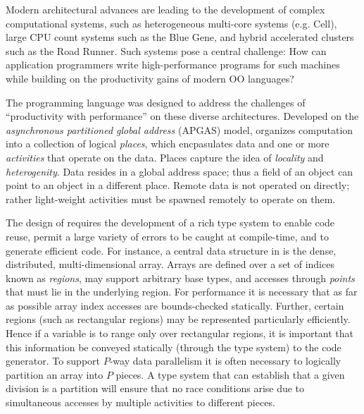 
Modern architectural advances are leading to the development of
complex computational systems, such as heterogeneous multi-core
systems (e.g. Cell), large CPU count systems such as the Blue Gene,
and hybrid accelerated clusters such as the Road Runner.  Such systems
pose a central challenge: How can application programmers write
high-performance programs for such machines while building on the
productivity gains of modern OO languages?

The \Xten{} programming language \cite{X10-concur,x10-oopsla05,x10} was
designed to address the challenges of ``productivity with
performance'' on these diverse architectures. Developed on
the {\em asynchronous partitioned global address} (APGAS) model, 
\Xten{} organizes computation into a collection of
logical {\em places}, which encpasulates data and one or more {\em
activities} that operate on the data. Places capture the idea of {\em
locality} 
and {\em heterogenity}. 
Data resides in a global address space; thus a
field of an object can point to an object in a different place. Remote
data is not operated on directly; rather light-weight activities
must be spawned remotely to operate on them.

The design of \Xten{} requires the development of a rich type system
to enable code reuse, permit a large variety of errors to be caught at
compile-time, and to generate efficient code. For instance, a central
data structure in \Xten{} is the dense, distributed, multi-dimensional
array. Arrays are defined over a set of indices known as {\em regions},
may support arbitrary base types, and accesses through {\em
points} that must lie in the underlying region. For performance it is
necessary that as far as possible array index accesses are
bounds-checked statically. Further, certain regions (such as
rectangular regions) may be represented particularly
efficiently. Hence if a variable is to range only over
rectangular regions, it is important that this information be conveyed
statically (through the type system) to the code 
generator. To support $P$-way data parallelism it is often necessary
to logically partition an array into $P$ pieces. A type system that
can establish that a given division is a partition will ensure that no
race conditions arise due to simultaneous accesses by
multiple activities to different pieces.

